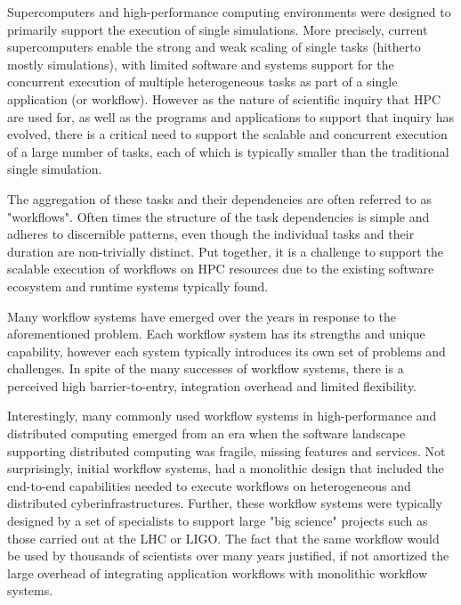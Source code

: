 

Supercomputers and high-performance computing environments were designed to
primarily support the execution of single simulations. More precisely, current
supercomputers enable the strong and weak scaling of single tasks (hitherto
mostly simulations), with limited software and systems support for the
concurrent execution of multiple heterogeneous tasks as part of a single
application (or workflow). However as the nature of scientific inquiry that
HPC are used for, as well as the programs and applications to support that
inquiry has evolved, there is a critical need to support the scalable and
concurrent execution of a large number of tasks, each of which is typically
smaller than the traditional single simulation.

The aggregation of these tasks and their dependencies are often referred to as
"workflows". Often times the structure of the task dependencies is simple and
adheres to discernible patterns, even though the individual tasks and their
duration are non-trivially distinct. Put together, it is a challenge to
support the scalable execution of workflows on HPC resources due to the
existing software ecosystem and runtime systems typically found.

Many workflow systems have emerged over the years in response to the
aforementioned problem. Each workflow system has its strengths and unique
capability, however each system typically introduces its own set of problems
and challenges. In spite of the many successes of workflow systems, there is a
perceived high barrier-to-entry, integration overhead and limited flexibility.

Interestingly, many commonly used workflow systems in high-performance and
distributed computing emerged from an era when the software landscape
supporting distributed computing was fragile, missing features and services.
Not surprisingly, initial workflow systems, had a monolithic design that
included the end-to-end capabilities needed to execute workflows on
heterogeneous and distributed cyberinfrastructures. Further, these workflow
systems were typically designed by a set of specialists to support large "big
science" projects such as those carried out at the LHC or LIGO. The fact that
the same workflow would be used by thousands of scientists over many years
justified, if not amortized the large overhead of integrating application
workflows with monolithic workflow systems.

